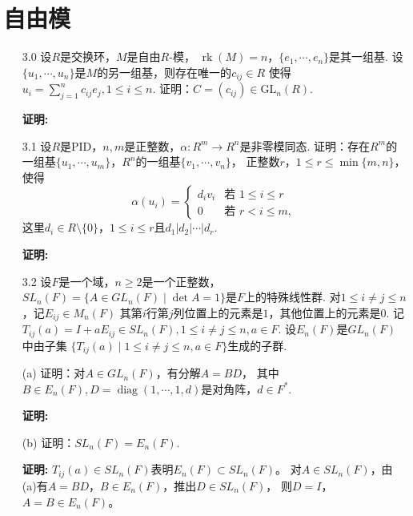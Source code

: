 \setcounter{section}{2}
\section{自由模}

\begin{enumerate}    
    \item[3.0]设$R$是交换环，$M$是自由$R$-模，
    $\operatorname{rk}(M)=n$，$\{e_1,\cdots,e_n\}$是其一组基.
    设$\{u_1,\cdots,u_n\}$是$M$的另一组基，则存在唯一的$c_{ij}\in R$
    使得$u_i=\sum\limits_{j=1}^nc_{ij}e_j,1\leq i\leq n$.
    证明：$C=(c_{ij})\in\mathrm{GL}_n(R)$.

    \item[\textbf{证明:}]

    \item[3.1]设$R$是PID，$n,m$是正整数，$\alpha\colon R^m\rightarrow R^n$是非零模同态.
    证明：存在$R^m$的一组基$\{u_1,\cdots,u_m\}$，$R^n$的一组基$\{v_1,\cdots,v_n\}$，
    正整数$r$，$1\leq r\leq\min\{m,n\}$，使得
    $$\alpha(u_i)=\begin{cases}d_iv_i&\text{若 }1\leq i\leq r\\
    0&\text{若 }r<i\leq m,\end{cases}$$
    这里$d_i\in R\setminus\{0\}$，$1\leq i\leq r$且$d_1|d_2|\cdots|d_r$.

    \item[\textbf{证明:}]

    \item[3.2]设$F$是一个域，$n\geq2$是一个正整数，
    $SL_n(F)=\{A\in GL_n(F)\mid\det A=1\}$是$F$上的特殊线性群.
    对$1\leq i\neq j\leq n$，记$E_{ij}\in M_n(F)$
    其第$i$行第$j$列位置上的元素是$1$，其他位置上的元素是$0$.
    记$T_{ij}(a)=I+aE_{ij}\in SL_n(F),1\leq i\neq j\leq n,a\in F$.
    设$E_n(F)$是$GL_n(F)$中由子集
    $\{T_{ij}(a)\mid 1\leq i\neq j\leq n,a\in F\}$生成的子群.
    \item[(a)]证明：对$A\in GL_n(F)$，有分解$A=BD$，
        其中$B\in E_n(F),D=\operatorname{diag}(1,\cdots,1,d)$是对角阵，$d\in F^*$.
    \item[\textbf{证明:}]

    \item[(b)]证明：$SL_n(F)=E_n(F)$.
    \item[\textbf{证明:}]
    $T_{ij}(a)\in SL_n(F)$表明$E_n(F)\subset SL_n(F)$。
    对$A\in SL_n(F)$，由(a)有$A=BD$，$B\in E_n(F)$，推出$D\in SL_n(F)$，
    则$D=I$，$A=B\in E_n(F)$。


\end{enumerate}
